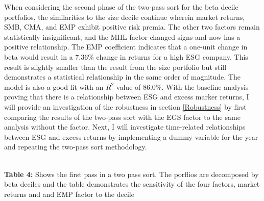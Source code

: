 When considering the second phase of the two-pass sort for the beta decile portfolios, the similarities to the size decile continue wherein market returns, SMB, CMA, and EMP exhibit positive risk premia. The other two factors remain statistically insignificant, and the MHL factor changed signs and now has a positive relationship. The EMP coefficient indicates that a one-unit change in beta would result in a 7.36\% change in returns for a high ESG company. This result is slightly smaller than the result from the size portfolio but still demonstrates a statistical relationship in the same order of magnitude. The model is also a good fit with an $R^2$ value of 86.0\%. With the baseline analysis proving that there is a relationship between ESG and excess marker returns, I will provide an investigation of the robustness in section \ref{Robustness} by first comparing the results of the two-pass sort with the EGS factor to the same analysis without the factor. Next, I will investigate time-related relationships between ESG and excess returns by implementing a dummy variable for the year and repeating the two-pass sort methodology.

\begin{center}
    \paperspacingnarrow
    \\
    \textbf{Table 4:} Shows the first pass in a two pass sort. The porflios are decomposed by beta deciles and the table demonstrates the sensitivity of the four factors, market returns and and EMP factor to the decile\\
    \paperspacingwide
\end{center}

